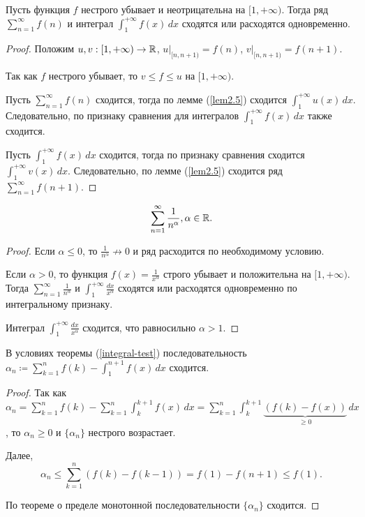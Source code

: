 \begin{theorem}
    \label{integral-test}
    Пусть функция $f$ нестрого убывает и неотрицательна на $[1, +\infty)$. Тогда ряд $\sum_{n = 1}^\infty f(n)$ и интеграл $\int_1^{+\infty} f(x)\, dx$ сходятся или расходятся одновременно.

    \begin{proof}
        Положим $u, v: [1, +\infty) \rightarrow \mathbb{R}$, $u\rvert_{[n, n + 1)} = f(n)$, $v\rvert_{[n, n + 1)} = f(n + 1)$.

        Так как $f$ нестрого убывает, то $v \le f \le u$ на $[1, +\infty)$.

        Пусть $\sum_{n = 1}^\infty f(n)$ сходится, тогда по лемме (\ref{lem2.5}) сходится $\int_1^{+\infty} u(x)\, dx$. Следовательно, по признаку сравнения для интегралов $\int_1^{+\infty} f(x)\, dx$ также сходится.

        Пусть $\int_1^{+\infty} f(x)\, dx$ сходится, тогда по признаку сравнения сходится $\int_1^{+\infty} v(x)\, dx$. Следовательно, по лемме (\ref{lem2.5}) сходится ряд $\sum_{n = 1}^\infty f(n + 1)$.
    \end{proof}
\end{theorem}

\begin{example}
    \[
        \sum_{n = 1}^\infty \frac{1}{n^\alpha}, \alpha \in \mathbb{R}.
    \]

    \begin{proof}
        Если $\alpha \le 0$, то $\frac{1}{n^\alpha} \not\rightarrow 0$ и ряд расходится по необходимому условию.

        Если $\alpha > 0$, то функция $f(x) = \frac{1}{x^\alpha}$ строго убывает и положительна на $[1, +\infty)$. Тогда $\sum_{n = 1}^\infty \frac{1}{n^\alpha}$ и $\int_1^{+\infty} \frac{dx}{x^\alpha}$ сходятся или расходятся одновременно по интегральному признаку.

        Интеграл $\int_1^{+\infty} \frac{dx}{x^\alpha}$ сходится, что равносильно $\alpha > 1$.
    \end{proof}
\end{example}

\begin{note}
    В условиях теоремы (\ref{integral-test}) последовательность $\alpha_n \coloneqq \sum_{k = 1}^n f(k) - \int_1^{n + 1} f(x)\, dx$ сходится.

    \begin{proof}
        Так как $\alpha_n = \sum_{k = 1}^n f(k) - \sum_{k = 1}^n \int_k^{k + 1} f(x)\, dx = \sum_{k = 1}^{n} \int_k^{k + 1} \underbrace{\left(f(k) - f(x)\right)}_{\ge 0}\, dx$, то $\alpha_n \ge 0$ и $\{\alpha_n\}$ нестрого возрастает.

        Далее,
        \[
            \alpha_n \le \sum_{k = 1}^n \left(f(k) - f(k - 1)\right) = f(1) - f(n + 1) \le f(1).
        \]

        По теореме о пределе монотонной последовательности $\{\alpha_n\}$ сходится.
    \end{proof}
\end{note}

